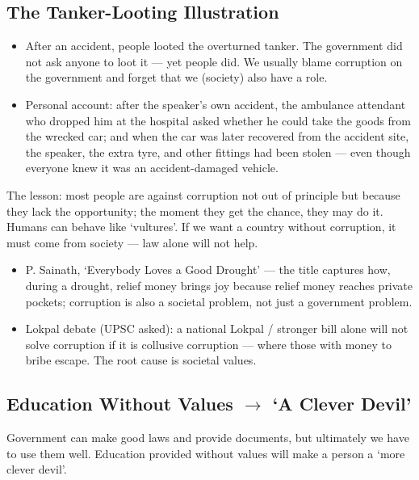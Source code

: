 \subsection{The Tanker-Looting Illustration}

\begin{ExampleBox}
\begin{itemize}
\item After an accident, people looted the overturned tanker. The government did not ask anyone to loot it --- yet people did. We usually blame corruption on the government and forget that we (society) also have a role.
\item Personal account: after the speaker's own accident, the ambulance attendant who dropped him at the hospital asked whether he could take the goods from the wrecked car; and when the car was later recovered from the accident site, the speaker, the extra tyre, and other fittings had been stolen --- even though everyone knew it was an accident-damaged vehicle.
\end{itemize}
\end{ExampleBox}

The lesson: most people are against corruption not out of principle but because they lack the opportunity; the moment they get the chance, they may do it. Humans can behave like `vultures'. If we want a country without corruption, it must come from society --- law alone will not help.

\begin{itemize}
\item P. Sainath, `Everybody Loves a Good Drought' --- the title captures how, during a drought, relief money brings joy because relief money reaches private pockets; corruption is also a societal problem, not just a government problem.
\item Lokpal debate (UPSC asked): a national Lokpal / stronger bill alone will not solve corruption if it is collusive corruption --- where those with money to bribe escape. The root cause is societal values.
\end{itemize}

\subsection{Education Without Values $\rightarrow$ `A Clever Devil'}

Government can make good laws and provide documents, but ultimately we have to use them well. Education provided without values will make a person a `more clever devil'.

